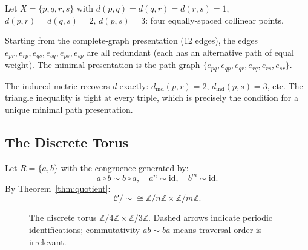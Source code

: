 \documentclass{article}
\theoremstyle{definition}
\theoremstyle{remark}
\newcommand{\RC}{\mathcal{C}}
\newcommand{\id}{\mathrm{id}}
\begin{document}
Let $X = \{p, q, r, s\}$ with
$d(p,q) = d(q,r) = d(r,s) = 1$, $d(p,r) = d(q,s) = 2$,
$d(p,s) = 3$: four equally-spaced collinear points.

Starting from the complete-graph presentation (12 edges), the
edges $e_{pr}, e_{rp}, e_{qs}, e_{sq}, e_{ps}, e_{sp}$ are all
redundant (each has an alternative path of equal weight). The
minimal presentation is the path graph
$\{e_{pq}, e_{qp}, e_{qr}, e_{rq}, e_{rs}, e_{sr}\}$.

The induced metric recovers $d$ exactly:
$d_{\mathrm{ind}}(p,r) = 2$, $d_{\mathrm{ind}}(p,s) = 3$, etc.
The triangle inequality is tight at every triple, which is
precisely the condition for a unique minimal path presentation.

\subsection{The Discrete Torus}
\label{sec:torus}

Let $R = \{a, b\}$ with the congruence generated by:
\[
  a \circ b \sim b \circ a, \quad a^n \sim \id, \quad b^m \sim \id.
\]
By Theorem~\ref{thm:quotient}:
\[
  \RC/{\sim} \cong \mathbb{Z}/n\mathbb{Z} \times \mathbb{Z}/m\mathbb{Z}.
\]

\begin{figure}[h]
\centering
{}
\caption{The discrete torus $\mathbb{Z}/4\mathbb{Z} \times
\mathbb{Z}/3\mathbb{Z}$. Dashed arrows indicate periodic
identifications; commutativity $ab \sim ba$ means traversal
order is irrelevant.}
\label{fig:torus}
\end{figure}
\end{document}
